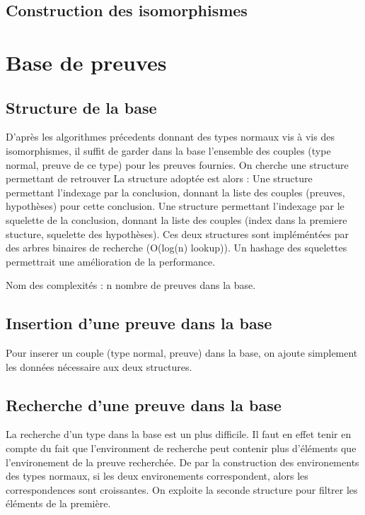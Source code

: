 \documentclass[12pt, a4paper]{article}
\begin{document}
\subsection{Construction des isomorphismes}



\section{Base de preuves}
\subsection{Structure de la base}

D'après les algorithmes précedents donnant des types normaux vis à vis des isomorphismes, il suffit de garder dans la base l'ensemble des couples (type normal, preuve de ce type) pour les preuves fournies. On cherche une structure permettant de retrouver 
La structure adoptée est alors : 
  Une structure permettant l'indexage par la conclusion, donnant la liste des couples (preuves, hypothèses) pour cette conclusion.
  Une structure permettant l'indexage par le squelette de la conclusion, donnant la liste des couples (index dans la premiere stucture, squelette des hypothèses).
  Ces deux structures sont impléméntées par des arbres binaires de recherche (O(log(n) lookup)). Un hashage des squelettes permettrait une amélioration de la performance.
 
 Nom des complexités : n  nombre de preuves dans la base.

\subsection{Insertion d'une preuve dans la base}

Pour inserer un couple (type normal, preuve) dans la base, on ajoute simplement les données nécessaire aux deux structures.

\subsection{Recherche d'une preuve dans la base}

La recherche d'un type dans la base est un plus difficile. Il faut en effet tenir en compte du fait que l'environment de recherche peut contenir plus d'éléments que l'environement de la preuve recherchée. De par la construction des environements des types normaux, si les deux environements correspondent, alors les correspondences sont croissantes.
On exploite la seconde structure pour filtrer les éléments de la première. 
\end{document}
